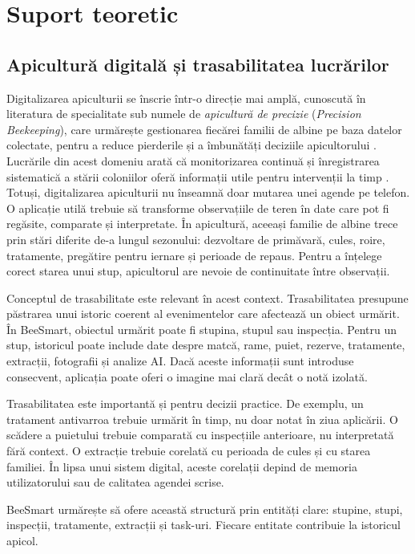 \chapter{Suport teoretic}
\label{chap:suport-teoretic}

\section{Apicultură digitală și trasabilitatea lucrărilor}

Digitalizarea apiculturii se înscrie într-o direcție mai amplă, cunoscută în literatura de specialitate sub numele de \emph{apicultură de precizie} (\emph{Precision Beekeeping}), care urmărește gestionarea fiecărei familii de albine pe baza datelor colectate, pentru a reduce pierderile și a îmbunătăți deciziile apicultorului \cite{zacepins2015precision}. Lucrările din acest domeniu arată că monitorizarea continuă și înregistrarea sistematică a stării coloniilor oferă informații utile pentru intervenții la timp \cite{meikle2015monitoring}. Totuși, digitalizarea apiculturii nu înseamnă doar mutarea unei agende pe telefon. O aplicație utilă trebuie să transforme observațiile de teren în date care pot fi regăsite, comparate și interpretate. În apicultură, aceeași familie de albine trece prin stări diferite de-a lungul sezonului: dezvoltare de primăvară, cules, roire, tratamente, pregătire pentru iernare și perioade de repaus. Pentru a înțelege corect starea unui stup, apicultorul are nevoie de continuitate între observații.

Conceptul de trasabilitate este relevant în acest context. Trasabilitatea presupune păstrarea unui istoric coerent al evenimentelor care afectează un obiect urmărit. În BeeSmart, obiectul urmărit poate fi stupina, stupul sau inspecția. Pentru un stup, istoricul poate include date despre matcă, rame, puiet, rezerve, tratamente, extracții, fotografii și analize AI. Dacă aceste informații sunt introduse consecvent, aplicația poate oferi o imagine mai clară decât o notă izolată.

Trasabilitatea este importantă și pentru decizii practice. De exemplu, un tratament antivarroa trebuie urmărit în timp, nu doar notat în ziua aplicării. O scădere a puietului trebuie comparată cu inspecțiile anterioare, nu interpretată fără context. O extracție trebuie corelată cu perioada de cules și cu starea familiei. În lipsa unui sistem digital, aceste corelații depind de memoria utilizatorului sau de calitatea agendei scrise.

BeeSmart urmărește să ofere această structură prin entități clare: stupine, stupi, inspecții, tratamente, extracții și task-uri. Fiecare entitate contribuie la istoricul apicol.

